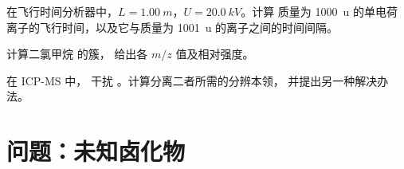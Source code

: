\begin{exercise}[$\star\star\star$]\label{exo:b2:mass-spec-atomic:10}
在飞行时间分析器中，$L = \qty{1.00}{m}$，$U = \qty{20.0}{kV}$。计算
质量为 \qty{1000}{u} 的单电荷离子的飞行时间，以及它与质量为 \qty{1001}{u} 的离子之间的时间间隔。
\end{exercise}

\begin{exercise}[$\star\star\star$]\label{exo:b2:mass-spec-atomic:11}
计算二氯甲烷  的簇，
给出各 $m/z$ 值及相对强度。
\end{exercise}

\begin{exercise}[$\star\star\star$]\label{exo:b2:mass-spec-atomic:12}
在 ICP-MS 中， 干扰 。计算分离二者所需的分辨本领，
并提出另一种解决办法。
\end{exercise}

\section{问题：未知卤化物}

